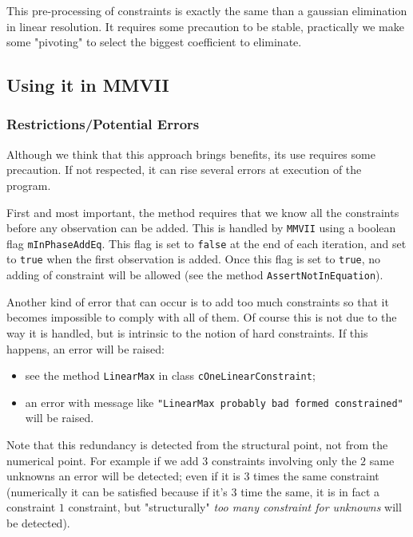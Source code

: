 This pre-processing of constraints is exactly the same than a gaussian elimination in linear resolution.
It requires some precaution to be stable, practically we make some "pivoting" to select the biggest coefficient
to eliminate.


\subsection{Using it in MMVII}

\label{Cstr:Use:MMVII}


\subsubsection{Restrictions/Potential Errors}

Although we think that this approach brings benefits, its use requires some precaution.
If not respected, it can rise several errors at execution of the program.

First and most important, the method requires that we know all the constraints
before any observation can be added.  This is handled by {\tt MMVII} using a boolean flag {\tt mInPhaseAddEq}.
This flag is set to {\tt false}  at the end of each iteration, and set to {\tt true} when
the first observation is added.  Once this flag is set to {\tt true}, no adding of constraint
will be allowed (see the method {\tt AssertNotInEquation}).

Another kind of error that can occur is to add too much constraints so that it becomes
impossible to comply with all of them. Of course this is not due to the way it is handled,
but is intrinsic to the notion of hard constraints. If this happens, an error
will be raised:

\begin{itemize}
     \item  see the method {\tt LinearMax} in class  {\tt cOneLinearConstraint};
     \item  an error with  message like {\tt "LinearMax probably bad formed constrained"} will be raised.
\end{itemize}

Note that this redundancy is detected from the structural point, not from the numerical point. For example
if we add $3$ constraints involving only the $2$ same unknowns an error will be detected; even if it is
$3$ times the same constraint (numerically it can be satisfied because if it's $3$ time the same, it is in
fact a constraint $1$ constraint, but "structurally" \emph{too many constraint for unknowns} will be detected).


